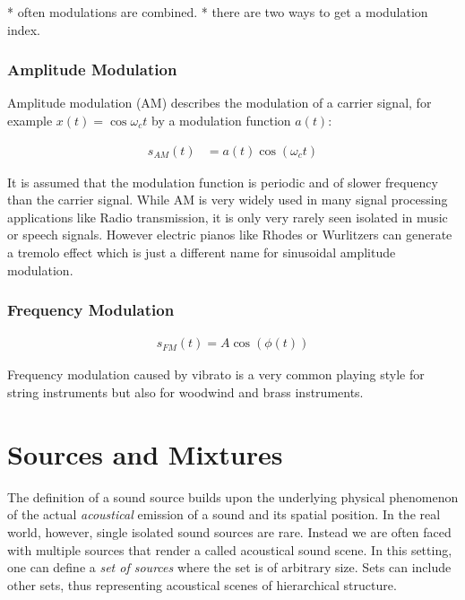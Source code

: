 * often modulations are combined.
* there are two ways to get a modulation index.

\subsubsection{Amplitude Modulation}

Amplitude modulation (AM) describes the modulation of a carrier signal, for example \(x(t) = \cos \omega_c t\) by a modulation function \(a(t)\):

\begin{align}
    s_{AM}(t) &= a(t) \cos \left( \omega_{c} t\right)
\end{align}

It is assumed that the modulation function is periodic and of slower frequency than the carrier signal.
While AM is very widely used in many signal processing applications like Radio transmission, it is only very rarely seen isolated in music or speech signals.
However electric pianos like Rhodes or Wurlitzers can generate a tremolo effect which is just a different name for sinusoidal amplitude modulation.

\subsubsection{Frequency Modulation}
\begin{align}
    s_{FM}(t) = A \cos(\phi(t))
\end{align}

Frequency  modulation  caused  by  vibrato  is  a  very  common
playing  style  for  string  instruments  but  also  for  woodwind  and
brass instruments.


\hypertarget{sources-and-mixtures}{%
\section{Sources and Mixtures}\label{sources-and-mixtures}}

The definition of a sound source builds upon the underlying physical
phenomenon of the actual \emph{acoustical} emission of a sound and its
spatial position.
In the real world, however, single isolated sound sources are rare.
Instead we are often faced with multiple sources that render a called acoustical sound scene.
In this setting, one can define a \emph{set of sources} where the set is of arbitrary size.
Sets can include other sets, thus representing acoustical scenes of hierarchical structure.

